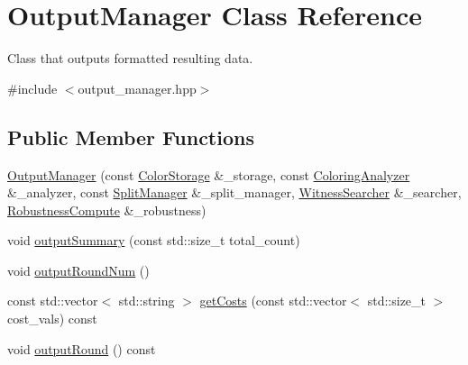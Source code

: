 \hypertarget{classOutputManager}{\section{\-Output\-Manager \-Class \-Reference}
\label{classOutputManager}
}


\-Class that outputs formatted resulting data.  




{\ttfamily \#include $<$output\-\_\-manager.\-hpp$>$}

\subsection*{\-Public \-Member \-Functions}
\begin{DoxyCompactItemize}
\item 
\hyperlink{classOutputManager_a02dfccbf1f4e1f4f61e7e7e8a2a97978}{\-Output\-Manager} (const \hyperlink{classColorStorage}{\-Color\-Storage} \&\-\_\-storage, const \hyperlink{classColoringAnalyzer}{\-Coloring\-Analyzer} \&\-\_\-analyzer, const \hyperlink{classSplitManager}{\-Split\-Manager} \&\-\_\-split\-\_\-manager, \hyperlink{classWitnessSearcher}{\-Witness\-Searcher} \&\-\_\-searcher, \hyperlink{classRobustnessCompute}{\-Robustness\-Compute} \&\-\_\-robustness)
\item 
void \hyperlink{classOutputManager_ad2fc6aa32779d30f69c600e5810126de}{output\-Summary} (const std\-::size\-\_\-t total\-\_\-count)
\item 
void \hyperlink{classOutputManager_aa3a6094bc7631bf8596fa29ff3e8e9e3}{output\-Round\-Num} ()
\item 
const std\-::vector$<$ std\-::string $>$ \hyperlink{classOutputManager_a7deb5d1b9ddb74848f9ea2e67cf47463}{get\-Costs} (const std\-::vector$<$ std\-::size\-\_\-t $>$ cost\-\_\-vals) const 
\item 
void \hyperlink{classOutputManager_af5e0986744d368e7e3e850d8ec7767b3}{output\-Round} () const 
\end{DoxyCompactItemize}


